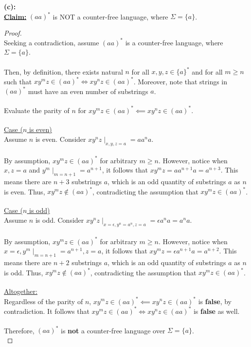 \documentclass[12pt]{article}
\begin{document}
\textbf{(c):} \\
\textbf{\underline{Claim:}} $(aa)^*$ is NOT a counter-free language, where $\Sigma = \{ a \}$.
\begin{proof}
\leavevmode\\
    Seeking a contradiction, assume $(aa)^*$ is a counter-free language, where $\Sigma = \{a\}$. \\
    \\
    Then, by definition, there exists natural $n$ for all $x, y, z \in \{a\}^*$ and for all $m \geq n$ such that $xy^mz \in (aa)^* \iff xy^nz \in (aa)^*$. Moreover, note that strings in $(aa)^*$ must have an even number of substrings $a$. \\
    \\
    Evaluate the parity of $n$ for $xy^mz \in (aa)^* \impliedby xy^nz \in (aa)^*$. \\
    \\
    \underline{Case ($n$ is even)} \\
    Assume $n$ is even. Consider $xy^nz \mid_{x, y, z = a} = aa^na$. \\
    \\
    By assumption, $xy^mz \in (aa)^*$ for arbitrary $m \geq n$. However, notice when $x, z = a$ and $y^m \mid_{m = n + 1} = a^{n + 1}$, it follows that $xy^mz = aa^{n + 1}a = a^{n + 3}$. This means there are $n + 3$ substrings $a$, which is an odd quantity of substrings $a$ as $n$ is even. Thus, $xy^mz \notin (aa)^*$, contradicting the assumption that $xy^mz \in (aa)^*$. \\
    \\
    \underline{Case ($n$ is odd)} \\
    Assume $n$ is odd. Consider $xy^nz \mid_{x = \epsilon, y^n = a^n, z = a} = \epsilon a^na = a^na$. \\
    \\
    By assumption, $xy^mz \in (aa)^*$ for arbitrary $m \geq n$. However, notice when $x = \epsilon, y^m \mid_{m = n + 1} = a^{n + 1}, z = a$, it follows that $xy^mz = \epsilon a^{n + 1} a = a^{n + 2}$. This means there are $n + 2$ substrings $a$, which is an odd quantity of substrings $a$ as $n$ is odd. Thus, $xy^mz \notin (aa)^*$, contradicting the assumption that $xy^mz \in (aa)^*$. \\
    \\
    \underline{Altogether:} \\
    Regardless of the parity of $n$, $xy^mz \in (aa)^* \impliedby xy^nz \in (aa)^*$ is \textbf{false}, by contradiction. It follows that $xy^mz \in (aa)^* \iff xy^nz \in (aa)^*$ is \textbf{false} as well. \\
    \\
    Therefore, $(aa)^*$ is \textbf{not} a counter-free language over $\Sigma = \{a\}$. \\
\end{proof}
\pagebreak
\end{document}
